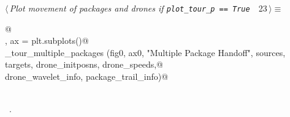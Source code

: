 \documentclass[10pt, english, oneside]{report}
\begin{document}
\begin{flushleft} \small
\begin{minipage}{\linewidth}\label{scrap29}\raggedright\small
{} $\langle\,${\itshape Plot movement of packages and drones if \verb|plot_tour_p == True |}\nobreak\ {\footnotesize {23}}$\,\rangle\equiv$
\vspace{-1ex}
\begin{list}{}{} \item
\mbox{}\verb@   @\\
\mbox{}\verb@fig, ax = plt.subplots()@\\
\mbox{}\verb@plot_tour_multiple_packages (fig0, ax0, "Multiple Package Handoff", sources, targets, drone_initposns, drone_speeds,@\\
\mbox{}\verb@          drone_wavelet_info, package_trail_info)@\\
\mbox{}\verb@@\\
\mbox{}\verb@@{\NWsep}
\end{list}
\vspace{-1.5ex}
\footnotesize
\begin{list}{}{\setlength{\itemsep}{-\parsep}\setlength{\itemindent}{-\leftmargin}}
\item \NWtxtMacroRefIn\ .

\item{}
\end{list}
\end{minipage}\vspace{4ex}
\end{flushleft}
\end{document}
